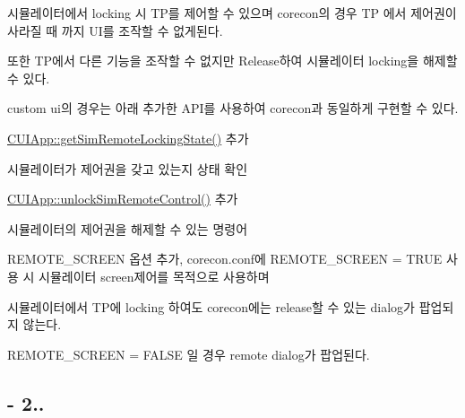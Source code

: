 \begin{DoxyEnumerate}
\item 시뮬레이터에서 locking 시 T\-P를 제어할 수 있으며 corecon의 경우 T\-P 에서 제어권이 사라질 때 까지 U\-I를 조작할 수 없게된다.\par
 또한 T\-P에서 다른 기능을 조작할 수 없지만 Release하여 시뮬레이터 locking을 해제할 수 있다.\par
 custom ui의 경우는 아래 추가한 A\-P\-I를 사용하여 corecon과 동일하게 구현할 수 있다. 
\begin{DoxyItemize}
\item \hyperlink{classCUIApp_af7ae494817cae7f75cc8c6ebe6734b06}{C\-U\-I\-App\-::get\-Sim\-Remote\-Locking\-State()} 추가
\begin{DoxyItemize}
\item 시뮬레이터가 제어권을 갖고 있는지 상태 확인
\end{DoxyItemize}
\item \hyperlink{classCUIApp_ad71f35d03ef250c61d8ce09ca8d7711d}{C\-U\-I\-App\-::unlock\-Sim\-Remote\-Control()} 추가
\begin{DoxyItemize}
\item 시뮬레이터의 제어권을 해제할 수 있는 명령어
\end{DoxyItemize}
\end{DoxyItemize}
\item R\-E\-M\-O\-T\-E\-\_\-\-S\-C\-R\-E\-E\-N 옵션 추가, corecon.\-conf에 R\-E\-M\-O\-T\-E\-\_\-\-S\-C\-R\-E\-E\-N = T\-R\-U\-E 사용 시 시뮬레이터 screen제어를 목적으로 사용하며 \par
 시뮬레이터에서 T\-P에 locking 하여도 corecon에는 release할 수 있는 dialog가 팝업되지 않는다.\par
 R\-E\-M\-O\-T\-E\-\_\-\-S\-C\-R\-E\-E\-N = F\-A\-L\-S\-E 일 경우 remote dialog가 팝업된다. 
\end{DoxyEnumerate}

\subsection*{-\/ 2..}


